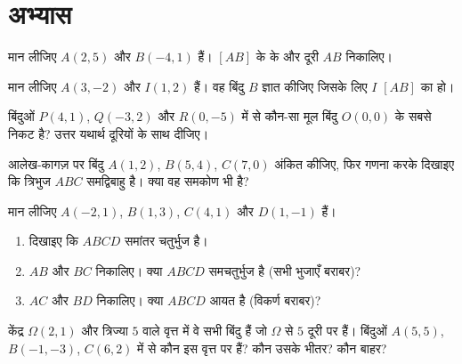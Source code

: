 \section{अभ्यास}

\begin{exercise}[$\star$]\label{exo:g10:coordgeom:1}
मान लीजिए $A(2, 5)$ और $B(-4, 1)$ हैं। $[AB]$ के  के  और दूरी $AB$
निकालिए।
\end{exercise}

\begin{exercise}[$\star$]\label{exo:g10:coordgeom:2}
मान लीजिए $A(3, -2)$ और $I(1, 2)$ हैं। वह बिंदु $B$ ज्ञात कीजिए जिसके लिए $I$
$[AB]$ का  हो।
\end{exercise}

\begin{exercise}[$\star$]\label{exo:g10:coordgeom:3}
बिंदुओं $P(4, 1)$, $Q(-3, 2)$ और $R(0, -5)$ में से कौन-सा मूल बिंदु $O(0,0)$ के सबसे निकट
है? उत्तर यथार्थ दूरियों के साथ दीजिए।
\end{exercise}

\begin{exercise}[$\star$]\label{exo:g10:coordgeom:4}
आलेख-कागज़ पर बिंदु $A(1, 2)$, $B(5, 4)$, $C(7, 0)$ अंकित कीजिए, फिर गणना करके दिखाइए
कि त्रिभुज $ABC$ समद्विबाहु है। क्या वह समकोण भी है?
\end{exercise}

\begin{exercise}[$\star\star$]\label{exo:g10:coordgeom:5}
मान लीजिए $A(-2, 1)$, $B(1, 3)$, $C(4, 1)$ और $D(1, -1)$ हैं।
\begin{enumerate}
  \item दिखाइए कि $ABCD$ समांतर चतुर्भुज है।
  \item $AB$ और $BC$ निकालिए। क्या $ABCD$ समचतुर्भुज है (सभी भुजाएँ
        बराबर)?
  \item $AC$ और $BD$ निकालिए। क्या $ABCD$ आयत है (विकर्ण बराबर)?
\end{enumerate}
\end{exercise}

\begin{exercise}[$\star\star$]\label{exo:g10:coordgeom:6}
केंद्र $\Omega(2, 1)$ और त्रिज्या $5$ वाले वृत्त में वे सभी बिंदु हैं जो $\Omega$ से
$5$ दूरी पर हैं। बिंदुओं $A(5, 5)$, $B(-1, -3)$, $C(6, 2)$ में से कौन इस वृत्त पर हैं?
कौन उसके भीतर? कौन बाहर?
\end{exercise}

